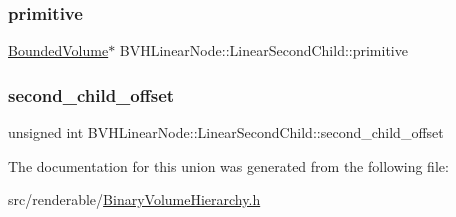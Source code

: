 \subsubsection{\texorpdfstring{primitive}{primitive}}
{\footnotesize\ttfamily \mbox{\hyperlink{classBoundedVolume}{Bounded\+Volume}}$\ast$ B\+V\+H\+Linear\+Node\+::\+Linear\+Second\+Child\+::primitive}

\mbox{\label{unionBVHLinearNode_1_1LinearSecondChild_ac0a41d4aa3236a1f51741467112ee9ba}} 
\subsubsection{\texorpdfstring{second\_child\_offset}{second\_child\_offset}}
{\footnotesize\ttfamily unsigned int B\+V\+H\+Linear\+Node\+::\+Linear\+Second\+Child\+::second\+\_\+child\+\_\+offset}



The documentation for this union was generated from the following file\+:\begin{DoxyCompactItemize}
\item 
src/renderable/\mbox{\hyperlink{BinaryVolumeHierarchy_8h}{Binary\+Volume\+Hierarchy.\+h}}\end{DoxyCompactItemize}
